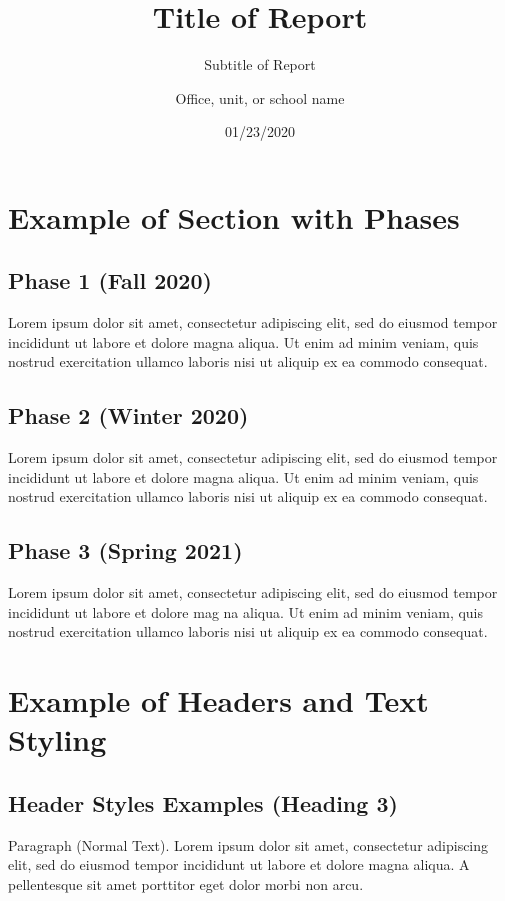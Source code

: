 \documentclass{nyu22report}
\title{Title of Report}
\subtitle{Subtitle of Report}
\author{Office, unit, or school name}
\date{01/23/2020}
\begin{document}
\maketitle

\tableofcontents

\chapter{Example of Section with Phases}

\section{Phase 1 (Fall 2020)}
Lorem ipsum dolor sit amet, consectetur adipiscing elit, sed do eiusmod tempor
incididunt ut labore et dolore magna aliqua. Ut enim ad minim veniam, quis
nostrud exercitation ullamco laboris nisi ut aliquip ex ea commodo consequat.

\section{Phase 2 (Winter 2020)}

Lorem ipsum dolor sit amet, consectetur adipiscing elit, sed do eiusmod tempor
incididunt ut labore et dolore magna aliqua. Ut enim ad minim veniam, quis
nostrud exercitation ullamco laboris nisi ut aliquip ex ea commodo consequat.

\section{Phase 3 (Spring 2021)}

Lorem ipsum dolor sit amet, consectetur adipiscing elit, sed do eiusmod tempor
incididunt ut labore et dolore mag  na aliqua. Ut enim ad minim veniam, quis
nostrud exercitation ullamco laboris nisi ut aliquip ex ea commodo consequat.


\chapter{Example of Headers and Text Styling}

\section{Header Styles Examples (Heading 3)}

Paragraph (Normal Text). Lorem ipsum dolor sit amet, consectetur adipiscing
elit, sed do eiusmod tempor incididunt ut labore et dolore magna aliqua. A
pellentesque sit amet porttitor eget dolor morbi non arcu.
\end{document}
